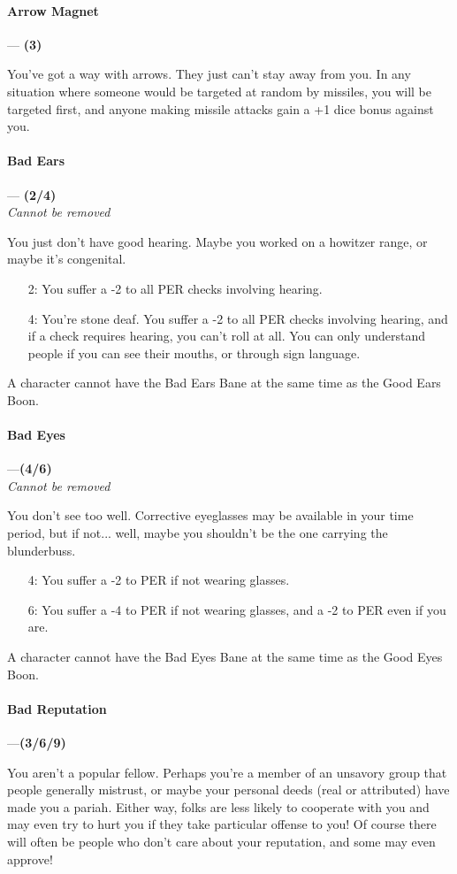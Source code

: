 \documentclass[oneside,11pt,english]{book}
\begin{document}
\paragraph{\label{bane:Arrow Magnet}Arrow Magnet}---\quad\textbf{ (3)}\par
You've got a way with arrows. They just can't stay away from you. In any situation where someone would 
be targeted at random by missiles, you will be targeted first, and anyone making missile attacks gain a +1 dice bonus against you. 
\paragraph{\label{bane:Bad Ears}Bad Ears}---\quad\textbf{ (2/4)}\\
\textit{Cannot be removed}\par
You just don't have good hearing. Maybe you worked on a howitzer range, or maybe it's congenital. 
\begin{itemize}
	\item [2:] You suffer a -2 to all PER checks involving hearing. 
	\item [4:] You're stone deaf. You suffer a -2 to all PER checks involving hearing, and if a check requires hearing, 
you can't roll at all. You can only understand people if you can see their mouths, or through sign 
language. 
\end{itemize}
A character cannot have the Bad Ears Bane at the same time as the Good Ears Boon. 
\paragraph{\label{bane:Bad Eyes}Bad Eyes}---\quad\textbf{(4/6)}\\
\textit{Cannot be removed}\par
You don't see too well. Corrective eyeglasses may be available in your time period, but if not... well, 
maybe you shouldn't be the one carrying the blunderbuss. 
\begin{itemize}
\item [4:] You suffer a -2 to PER if not wearing glasses. 
\item [6:] You suffer a -4 to PER if not wearing glasses, and a -2 to PER even if you are. 
\end{itemize}
A character cannot have the Bad Eyes Bane at the same time as the Good Eyes Boon. 
\paragraph{\label{bane:Bad Reputation}Bad Reputation}---\quad\textbf{(3/6/9) }\par
You aren't a popular fellow. Perhaps you're a member of an unsavory group that people generally 
mistrust, or maybe your personal deeds (real or attributed) have made you a pariah. Either way, folks are less likely to cooperate with you and may even try to hurt you if they take particular offense to you! Of 
course there will often be people who don't care about your reputation, and some may even approve! 
\end{document}
